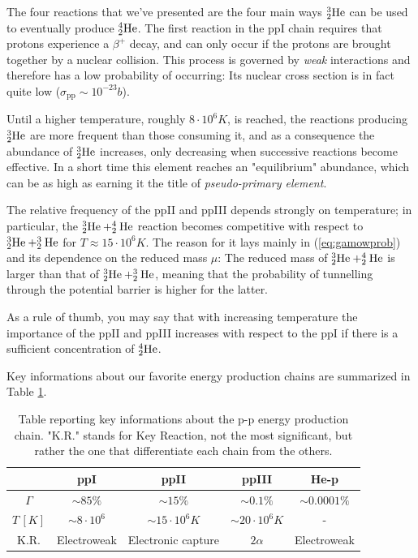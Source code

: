\par The four reactions that we've presented are the four main ways $\element{He}{3}{2}$ can be used to eventually produce $\element{He}{4}{2}$. The first reaction in the ppI chain requires that protons experience a $\beta^{+}$ decay, and can only occur if the protons are brought together by a nuclear collision. This process is governed by \emph{weak} interactions and therefore has a low probability of occurring: Its nuclear cross section is in fact quite low ($\sigma_{\text{pp}}\sim 10^{-23}\unit{b}$).
\par Until a higher temperature, roughly $8\cdot10^{6}\unit{K}$, is reached, the reactions producing $\element{He}{3}{2}$ are more frequent than those consuming it, and as a consequence the abundance of $\element{He}{3}{2}$ increases, only decreasing when successive reactions become effective. In a short time this element reaches an "equilibrium" abundance, which can be as high as earning it the title of \emph{pseudo-primary element}.
\par The relative frequency of the ppII and ppIII depends strongly on temperature; in particular, the $\element{He}{3}{2}+\element{He}{4}{2}$ reaction becomes competitive with respect to $\element{He}{3}{2}+\element{He}{3}{2}$ for $T\approx 15\cdot 10^{6}\unit{K}$. The reason for it lays mainly in (\ref{eq:gamowprob}) and its dependence on the reduced mass $\mu$: The reduced mass of $\element{He}{3}{2}+\element{He}{4}{2}$ is larger than that of $\element{He}{3}{2}+\element{He}{3}{2}$, meaning that the probability of tunnelling through the potential barrier is higher for the latter.
\par As a rule of thumb, you may say that with increasing temperature the importance of the ppII and ppIII increases with respect to the ppI if there is a sufficient concentration of $\element{He}{4}{2}$.
\par Key informations about our favorite energy production chains are summarized in Table \ref{tbl:pp}.
\begin{table}[h!]
    \centering
    \begin{tabular}{c|c|c|c|c}
        & ppI & ppII & ppIII & He-p\\
        \hline
        $\Gamma$ & $\sim 85\%$ & $\sim 15\%$ & $\sim 0.1\%$ & $\sim 0.0001\%$\\
        \hline 
        $T\,[K]$ & $\sim 8\cdot 10^{6}$ & $\sim 15\cdot 10^{6}\unit{K}$ & $\sim 20\cdot 10^{6}\unit{K}$ & - \\
        \hline
        K.R. & Electroweak & Electronic capture & $2\alpha$ & Electroweak
        \vspace{7pt}
    \end{tabular}
    \caption{Table reporting key informations about the p-p energy production chain. "K.R." stands for Key Reaction, not the most significant, but rather the one that differentiate each chain from the others.}
    \label{tbl:pp}
\end{table}

